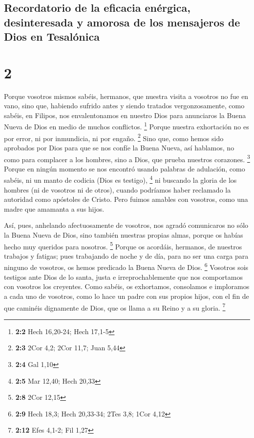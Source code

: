 \hypertarget{recordatorio-de-la-eficacia-enuxe9rgica-desinteresada-y-amorosa-de-los-mensajeros-de-dios-en-tesaluxf3nica}{%
\subsection{Recordatorio de la eficacia enérgica, desinteresada y
amorosa de los mensajeros de Dios en
Tesalónica}\label{recordatorio-de-la-eficacia-enuxe9rgica-desinteresada-y-amorosa-de-los-mensajeros-de-dios-en-tesaluxf3nica}}

\hypertarget{section-1}{%
\section{2}\label{section-1}}

 Porque vosotros mismos sabéis, hermanos, que nuestra
visita a vosotros no fue en vano,  sino que, habiendo
sufrido antes y siendo tratados vergonzosamente, como sabéis, en
Filipos, nos envalentonamos en nuestro Dios para anunciaros la Buena
Nueva de Dios en medio de muchos conflictos. \footnote{\textbf{2:2} Hech
  16,20-24; Hech 17,1-5}  Porque nuestra exhortación no es
por error, ni por inmundicia, ni por engaño. \footnote{\textbf{2:3} 2Cor
  4,2; 2Cor 11,7; Juan 5,44}  Sino que, como hemos sido
aprobados por Dios para que se nos confíe la Buena Nueva, así hablamos,
no como para complacer a los hombres, sino a Dios, que prueba nuestros
corazones. \footnote{\textbf{2:4} Gal 1,10}  Porque en
ningún momento se nos encontró usando palabras de adulación, como
sabéis, ni un manto de codicia (Dios es testigo), \footnote{\textbf{2:5}
  Mar 12,40; Hech 20,33}  ni buscando la gloria de los
hombres (ni de vosotros ni de otros), cuando podríamos haber reclamado
la autoridad como apóstoles de Cristo.  Pero fuimos
amables con vosotros, como una madre que amamanta a sus hijos.

 Así, pues, anhelando afectuosamente de vosotros, nos
agradó comunicaros no sólo la Buena Nueva de Dios, sino también nuestras
propias almas, porque os habías hecho muy queridos para nosotros.
\footnote{\textbf{2:8} 2Cor 12,15}  Porque os acordáis,
hermanos, de nuestros trabajos y fatigas; pues trabajando de noche y de
día, para no ser una carga para ninguno de vosotros, os hemos predicado
la Buena Nueva de Dios. \footnote{\textbf{2:9} Hech 18,3; Hech 20,33-34;
  2Tes 3,8; 1Cor 4,12}  Vosotros sois testigos ante Dios
de lo santa, justa e irreprochablemente que nos comportamos con vosotros
los creyentes.  Como sabéis, os exhortamos, consolamos e
imploramos a cada uno de vosotros, como lo hace un padre con sus propios
hijos,  con el fin de que caminéis dignamente de Dios,
que os llama a su Reino y a su gloria. \footnote{\textbf{2:12} Efes
  4,1-2; Fil 1,27}

